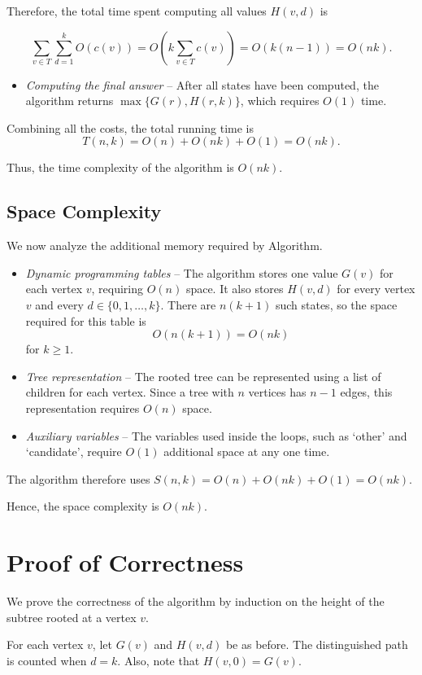 \documentclass[11pt]{scrartcl}
\theoremstyle{plain}
\theoremstyle{definition}
\theoremstyle{remark}
\begin{document}
Therefore, the total time spent computing all values $H(v,d)$ is

\[\sum_{v\in T}\sum_{d=1}^{k}O(c(v))= O\left(k\sum_{v\in T}c(v)\right)= O(k(n-1))= O(nk).\]

\begin{itemize}
    \item \textit{Computing the final answer} -- After all states have been computed, the algorithm returns $\max\{G(r),H(r,k)\}$, which requires $O(1)$ time.
\end{itemize}

Combining all the costs, the total running time is \[T(n,k)=O(n)+O(nk)+O(1)=O(nk).\]

Thus, the time complexity of the algorithm is $O(nk).$

\subsection{Space Complexity}
We now analyze the additional memory required by Algorithm.

\begin{itemize}
    \item \textit{Dynamic programming tables} -- The algorithm stores one value $G(v)$ for each vertex $v$, requiring $O(n)$ space. It also stores $H(v,d)$ for every vertex $v$ and every $d\in\{0,1,\ldots,k\}$. There are $n(k+1)$ such states, so the space required for this table is \[O(n(k+1))=O(nk)\] for $k\geq 1$.
    \item \textit{Tree representation} -- The rooted tree can be represented using a list of children for each vertex. Since a tree with $n$ vertices has $n-1$ edges, this representation requires $O(n)$ space.
    \item \textit{Auxiliary variables} -- The variables used inside the loops, such as `other' and `candidate', require $O(1)$ additional space at any one time. 
\end{itemize}

The algorithm therefore uses $S(n,k)=O(n)+O(nk)+O(1)=O(nk).$

Hence, the space complexity is $O(nk).$

\section{Proof of Correctness}
We prove the correctness of the algorithm by induction on the height of the subtree rooted at a vertex $v$.

For each vertex $v$, let $G(v)$ and $H(v,d)$ be as before. The distinguished path is counted when $d=k$. Also, note that $H(v,0)=G(v)$.
\end{document}
